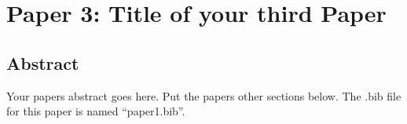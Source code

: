 \chapter{Paper 3: Title of your third Paper}

\section{Abstract}

Your papers abstract goes here. Put the papers other sections below.
The .bib file for this paper is named ``paper1.bib''.

\singlespacing


\doublespacing
